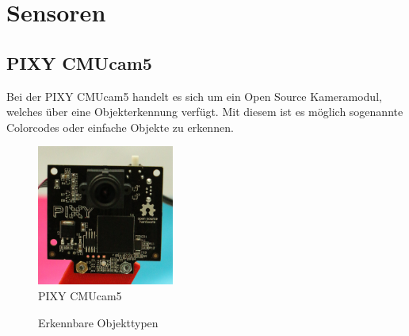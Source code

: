 \chapter{Sensoren}
\renewcommand{\kapitelautor}{Autor: Lucas Ullrich}

\section{PIXY CMUcam5}
Bei der PIXY CMUcam5 handelt es sich um ein Open Source Kameramodul, welches über eine Objekterkennung verfügt.
Mit diesem ist es möglich sogenannte Colorcodes oder einfache Objekte zu erkennen.

\begin{figure}[H]
  \begin{centering}
    \includegraphics[width = 0.4\textwidth]{Bilder/Pixy_CMUcam5}
  \par\end{centering}
  \caption{PIXY CMUcam5}
  \label{PIXY}
\end{figure}

\begin{figure}[H]
  \begin{centering}
  \par\end{centering}
  \caption{Erkennbare Objekttypen}
  \label{PIXY_Objekte}
\end{figure}

